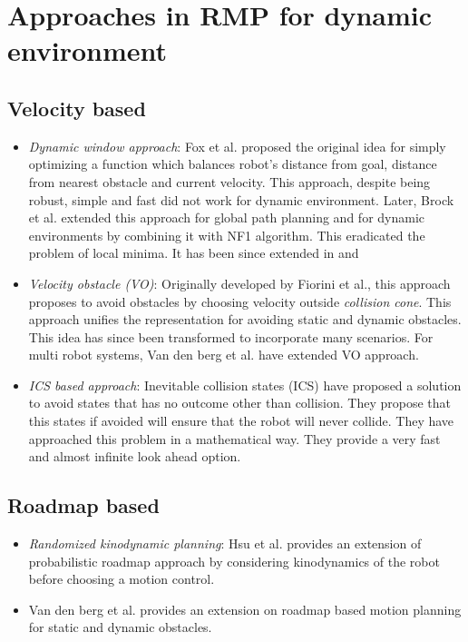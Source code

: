 \documentclass[rnd]{mas_proposal}
\begin{document}
\section{Approaches in RMP for dynamic environment}
\subsection{Velocity based}
\begin{itemize}
    \item \textit{Dynamic window approach}: Fox et al. \cite{fox1997dynamic} proposed the original idea for simply optimizing a function which balances robot's distance from goal, distance from nearest obstacle and current velocity. This approach, despite being robust, simple and fast did not work for dynamic environment. 
        Later, Brock et al. \cite{brock1999high} extended this approach for global path planning and for dynamic environments by combining it with NF1 algorithm. 
        This eradicated the problem of local minima. 
        It has been since extended in \cite{seder2007dynamic} and \cite{ogren2005convergent}
    \item \textit{Velocity obstacle (VO)}: Originally developed by Fiorini et al.\cite{fiorini1998motion}, this approach proposes to avoid obstacles by choosing velocity outside \textit{collision cone}.
        This approach unifies the representation for avoiding static and dynamic obstacles.
        This idea has since been transformed to incorporate many scenarios\cite{shiller2010nonlinear}\cite{owen2006a}\cite{owen2005motion}\cite{guy2009clearpath}. 
        For multi robot systems, Van den berg et al.\cite{van2008reciprocal}\cite{van2011reciprocal}\cite{van2006anytime} have extended VO approach.
    \item \textit{ICS based approach}: Inevitable collision states (ICS) \cite{fraichard2004inevitable}\cite{petti2005safe}\cite{martinez2009collision} have proposed a solution to avoid states that has no outcome other than collision. They propose that this states if avoided will ensure that the robot will never collide. They have approached this problem in a mathematical way. They provide a very fast and almost infinite look ahead option\cite{mohanan2018a}.

\end{itemize}

\subsection{Roadmap based}
\begin{itemize}
    \item \textit{Randomized kinodynamic planning}: Hsu et al.\cite{hsu2002randomized} provides an extension of probabilistic roadmap approach by considering kinodynamics of the robot before choosing a motion control.
    \item Van den berg et al.\cite{van2005roadmap} provides an extension on roadmap based motion planning for static and dynamic obstacles.
\end{itemize}
\end{document}
